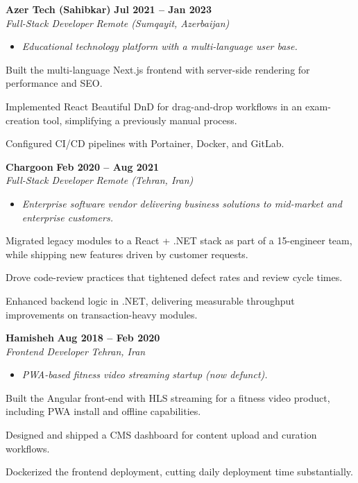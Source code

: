 \documentclass[letterpaper,10pt]{article}
\newcommand{\heading}[2]{
  \hspace{10pt}#1\hfill#2\\
}
\newcommand{\headingBf}[2]{
  \heading{\textbf{#1}}{\textbf{#2}}
}
\newcommand{\headingIt}[2]{
  \heading{\textit{#1}}{\textit{#2}}
}
\newenvironment{resume_list}{
  \vspace{-7pt}
  \begin{itemize}[itemsep=-2px, parsep=1pt, leftmargin=30pt]
}{
  \end{itemize}
  \vspace{1pt}
}
\newcommand{\companyDescription}[1]{
  \vspace{-7pt}
  \begin{itemize}[itemsep=-2px, parsep=1pt, leftmargin=12pt]
    \item[] {\color{textMuted}\textit{#1}}
  \end{itemize}
  \vspace{-4pt}
}
\begin{document}
  \headingBf{ Azer Tech (Sahibkar) }{ Jul 2021 -- Jan 2023 }
  \headingIt{ Full-Stack Developer }{ Remote (Sumqayit, Azerbaijan) }
  \companyDescription{ Educational technology platform with a multi-language user base. }
  \begin{resume_list}
    \item Built the multi-language Next.js frontend with server-side rendering for performance and SEO.
    \item Implemented React Beautiful DnD for drag-and-drop workflows in an exam-creation tool, simplifying a previously manual process.
    \item Configured CI/CD pipelines with Portainer, Docker, and GitLab.
  \end{resume_list}

  \headingBf{ Chargoon }{ Feb 2020 -- Aug 2021 }
  \headingIt{ Full-Stack Developer }{ Remote (Tehran, Iran) }
  \companyDescription{ Enterprise software vendor delivering business solutions to mid-market and enterprise customers. }
  \begin{resume_list}
    \item Migrated legacy modules to a React + .NET stack as part of a 15-engineer team, while shipping new features driven by customer requests.
    \item Drove code-review practices that tightened defect rates and review cycle times.
    \item Enhanced backend logic in .NET, delivering measurable throughput improvements on transaction-heavy modules.
  \end{resume_list}

  \headingBf{ Hamisheh }{ Aug 2018 -- Feb 2020 }
  \headingIt{ Frontend Developer }{ Tehran, Iran }
  \companyDescription{ PWA-based fitness video streaming startup (now defunct). }
  \begin{resume_list}
    \item Built the Angular front-end with HLS streaming for a fitness video product, including PWA install and offline capabilities.
    \item Designed and shipped a CMS dashboard for content upload and curation workflows.
    \item Dockerized the frontend deployment, cutting daily deployment time substantially.
  \end{resume_list}
\end{document}
